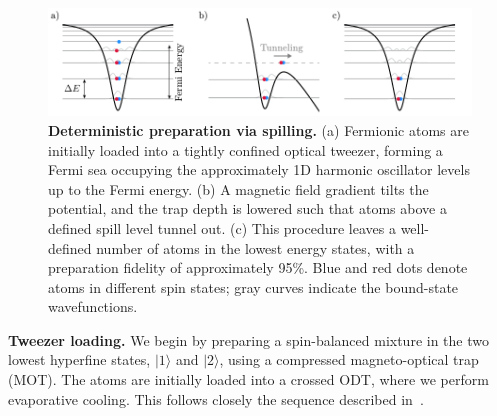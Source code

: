 



\begin{figure}
    \centering
    \includegraphics{fig-ai/preparation.pdf}
    \caption{
        \textbf{Deterministic preparation via spilling.}
        (a) Fermionic atoms are initially loaded into a tightly confined optical tweezer, forming a Fermi sea occupying the approximately 1D harmonic oscillator levels up to the Fermi energy. 
        (b) A magnetic field gradient tilts the potential, and the trap depth is lowered such that atoms above a defined spill level tunnel out. 
        (c) This procedure leaves a well-defined number of atoms in the lowest energy states, with a preparation fidelity of approximately 95\%. 
        Blue and red dots denote atoms in different spin states; gray curves indicate the bound-state wavefunctions.
    }
    \label{fig:preparation}
\end{figure}



\textbf{Tweezer loading.} We begin by preparing a spin-balanced mixture in the two lowest hyperfine states, $|1\rangle$ and $|2\rangle$, using a compressed magneto-optical trap (MOT). The atoms are initially loaded into a crossed ODT, where we perform evaporative cooling. This follows closely the sequence described in~\cite{culemann_construction_2024}.

